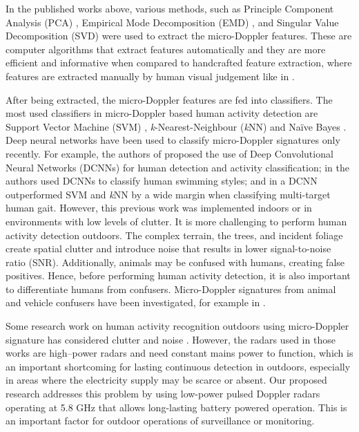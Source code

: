 In the published works above, various methods, such as Principle Component Analysis (PCA) \cite{mobasseri2009time}, Empirical Mode Decomposition (EMD) \cite{fairchild2014classification}, and Singular Value Decomposition (SVD) \cite{fioranelli2015classification,fioranelli2016performance} were used to extract the micro-Doppler features. These are computer algorithms that extract features automatically and they are more efficient and informative when compared to handcrafted feature extraction, where features are extracted manually by human visual judgement like in \cite{ccaugliyan2015micro,kim2009human,zenaldin2016radar,bjorklund2011millimeter}. 

After being extracted, the micro-Doppler features are fed into classifiers. The most used classifiers in micro-Doppler based human activity detection are Support Vector Machine (SVM) \cite{kim2009human,zenaldin2016radar,zabalza2014robust}, \textit{k}-Nearest-Neighbour (\textit{k}NN) \cite{ccaugliyan2015micro} and Na\"ive Bayes \cite{nanzer2009bayesian}. Deep neural networks have been used to classify micro-Doppler signatures only recently. For example, the authors of \cite{kim2016human} proposed the use of Deep Convolutional Neural Networks (DCNNs) for human detection and activity classification; in \cite{kim2016classification} the authors used DCNNs to classify human swimming styles; and in \cite{tahmoush2010ugs} a DCNN outperformed SVM and \textit{k}NN by a wide margin when classifying multi-target human gait. However, this previous work was implemented indoors or in environments with low levels of clutter. It is more challenging to perform human activity detection outdoors. The complex terrain, the trees, and incident foliage create spatial clutter and introduce noise that results in lower signal-to-noise ratio (SNR). Additionally, animals may be confused with humans, creating false positives. Hence, before performing human activity detection, it is also important to differentiate humans from confusers. Micro-Doppler signatures from animal and vehicle confusers have been investigated, for example in \cite{miller2013micro,lee2017classification,smith2008naive}.

Some research work on human activity recognition outdoors using micro-Doppler signature has considered clutter and noise \cite{zenaldin2016radar,tahmoush2010ugs,karabacak2015knowledge,tahmoush2009radar}. However, the radars used in those works are high--power radars and need constant mains power to function, which is an important shortcoming for lasting continuous detection in outdoors, especially in areas where the electricity supply may be scarce or absent. Our proposed research addresses this problem by using low-power pulsed Doppler radars operating at 5.8 GHz that allows long-lasting battery powered operation. This is an important factor for outdoor operations of surveillance or monitoring.

